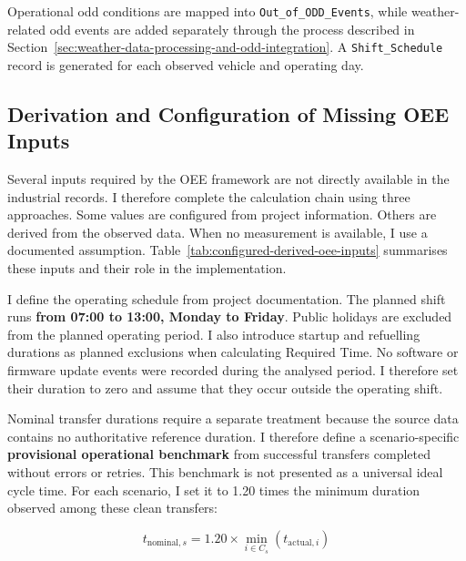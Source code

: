 Operational \gls{odd} conditions are mapped into \texttt{Out\_of\_ODD\_Events}, while weather-related \gls{odd} events are added separately through the process described in Section~\ref{sec:weather-data-processing-and-odd-integration}. A \texttt{Shift\_Schedule} record is generated for each observed vehicle and operating day.


\subsection{Derivation and Configuration of Missing OEE Inputs}
\label{subsec:derivation-and-configuration-of-missing-oee-inputs}
Several inputs required by the OEE framework are not directly available in the industrial records. I therefore complete the calculation chain using three approaches. Some values are configured from project information. Others are derived from the observed data. When no measurement is available, I use a documented assumption. Table~\ref{tab:configured-derived-oee-inputs} summarises these inputs and their role in the implementation.

I define the operating schedule from project documentation. The planned shift runs \textbf{from 07:00 to 13:00, Monday to Friday}. Public holidays are excluded from the planned operating period. I also introduce startup and refuelling durations as planned exclusions when calculating Required Time. No software or firmware update events were recorded during the analysed period. I therefore set their duration to zero and assume that they occur outside the operating shift.

Nominal transfer durations require a separate treatment because the source data contains no authoritative reference duration. I therefore define a scenario-specific \textbf{provisional operational benchmark} from successful transfers completed without errors or retries. This benchmark is not presented as a universal ideal cycle time. For each scenario, I set it to 1.20 times the minimum duration observed among these clean transfers:

$$
t_{\mathrm{nominal},s} = 1.20 \times \min_{i \in C_s} \left(t_{\mathrm{actual},i}\right)
$$

